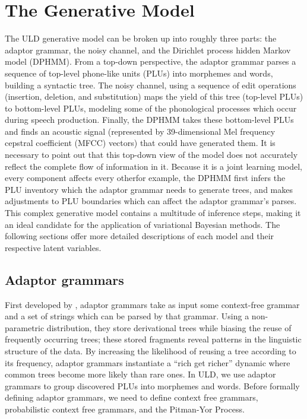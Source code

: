 \documentclass[12pt,letterpaper]{article}
\begin{document}
\section{The Generative Model}
The ULD generative model can be broken up into roughly three parts: the adaptor grammar, the noisy channel, and the Dirichlet process hidden Markov model (DPHMM). From a top-down perspective, the adaptor grammar parses a sequence of top-level phone-like units (PLUs) into morphemes and words, building a syntactic tree. The noisy channel, using a sequence of edit operations (insertion, deletion, and substitution) maps the yield of this tree (top-level PLUs) to bottom-level PLUs, modeling some of the phonological processes which occur during speech production. Finally, the DPHMM takes these bottom-level PLUs and finds an acoustic signal (represented by 39-dimensional Mel frequency cepstral coefficient (MFCC) vectors) that could have generated them. It is necessary to point out that this top-down view of the model does not accurately reflect the complete flow of information in it. Because it is a joint learning model, every component affects every other\textemdash for example, the DPHMM first infers the PLU inventory which the adaptor grammar needs to generate trees, and makes adjustments to PLU boundaries which can affect the adaptor grammar's parses. This complex generative model contains a multitude of inference steps, making it an ideal candidate for the application of variational Bayesian methods. The following sections offer more detailed descriptions of each model and their respective latent variables. 

\subsection{Adaptor grammars}
First developed by \citet{johnson:2007}, adaptor grammars take as input some context-free grammar and a set of strings which can be parsed by that grammar. Using a non-parametric distribution, they store derivational trees while biasing the reuse of frequently occurring trees; these stored fragments reveal patterns in the linguistic structure of the data. By increasing the likelihood of reusing a tree according to its frequency, adaptor grammars instantiate a ``rich get richer'' dynamic where common trees become more likely than rare ones. In ULD, we use adaptor grammars to group discovered PLUs into morphemes and words. Before formally defining adaptor grammars, we need to define context free grammars, probabilistic context free grammars, and the Pitman-Yor Process.
\end{document}
